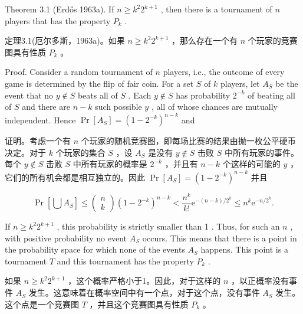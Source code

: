 \documentclass[10pt]{article}
\begin{document}
Theorem 3.1 (Erdős 1963a). If \(n \geq  {k}^{2}{2}^{k + 1}\) , then there is a tournament of \(n\) players that has the property \({P}_{k}\) .

\begin{tcolorbox}\relax
定理3.1(厄尔多斯，1963a)。如果 \(n \geq  {k}^{2}{2}^{k + 1}\) ，那么存在一个有 \(n\) 个玩家的竞赛图具有性质 \({P}_{k}\) 。
\end{tcolorbox}

Proof. Consider a random tournament of \(n\) players, i.e., the outcome of every game is determined by the flip of fair coin. For a set \(S\) of \(k\) players, let \({A}_{S}\) be the event that no \(y \notin  S\) beats all of \(S\) . Each \(y \notin  S\) has probability \({2}^{-k}\) of beating all of \(S\) and there are \(n - k\) such possible \(y\) , all of whose chances are mutually independent. Hence \(\Pr \left\lbrack  {A}_{S}\right\rbrack   = {\left( 1 - {2}^{-k}\right) }^{n - k}\) and

\begin{tcolorbox}\relax
证明。考虑一个有 \(n\) 个玩家的随机竞赛图，即每场比赛的结果由抛一枚公平硬币决定。对于 \(k\) 个玩家的集合 \(S\) ，设 \({A}_{S}\) 是没有 \(y \notin  S\) 击败 \(S\) 中所有玩家的事件。每个 \(y \notin  S\) 击败 \(S\) 中所有玩家的概率是 \({2}^{-k}\) ，并且有 \(n - k\) 个这样的可能的 \(y\) ，它们的所有机会都是相互独立的。因此 \(\Pr \left\lbrack  {A}_{S}\right\rbrack   = {\left( 1 - {2}^{-k}\right) }^{n - k}\) 并且
\end{tcolorbox}

\[
\Pr \left\lbrack  {\bigcup {A}_{S}}\right\rbrack   \leq  \left( \begin{array}{l} n \\  k \end{array}\right) {\left( 1 - {2}^{-k}\right) }^{n - k} < \frac{{n}^{k}}{k!}{\mathrm{e}}^{-\left( {n - k}\right) /{2}^{k}} \leq  {n}^{k}{\mathrm{e}}^{-n/{2}^{k}}.
\]

If \(n \geq  {k}^{2}{2}^{k + 1}\) , this probability is strictly smaller than 1 . Thus, for such an \(n\) , with positive probability no event \({A}_{S}\) occurs. This means that there is a point in the probability space for which none of the events \({A}_{S}\) happens. This point is a tournament \(T\) and this tournament has the property \({P}_{k}\) .

\begin{tcolorbox}\relax
如果 \(n \geq  {k}^{2}{2}^{k + 1}\) ，这个概率严格小于1。因此，对于这样的 \(n\) ，以正概率没有事件 \({A}_{S}\) 发生。这意味着在概率空间中有一个点，对于这个点，没有事件 \({A}_{S}\) 发生。这个点是一个竞赛图 \(T\) ，并且这个竞赛图具有性质 \({P}_{k}\) 。
\end{tcolorbox}
\end{document}
